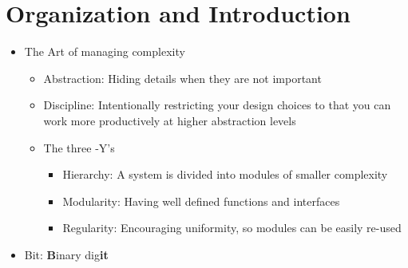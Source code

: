 \documentclass[a4paper]{article}
\begin{document}
\section{Organization and Introduction}
\begin{itemize}
\item The Art of managing complexity
\begin{itemize}
\item Abstraction: Hiding details when they are not important
\item Discipline: Intentionally restricting your design choices to that you can work more productively at higher abstraction levels
\item The three -Y's
\begin{itemize}
\item Hierarchy: A system is divided into modules of smaller complexity
\item Modularity: Having well defined functions and interfaces
\item Regularity: Encouraging uniformity, so modules can be easily re-used
\end{itemize}
\end{itemize}
\item Bit: \textbf{B}inary dig\textbf{it}
\end{itemize}
\end{document}
